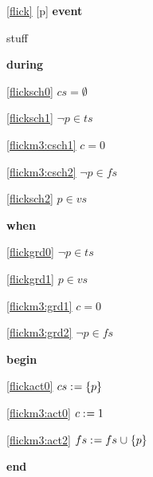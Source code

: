 \noindent \ref{flick} [p] \textbf{event}
  \item   \begin{block}
    \item   stuff
  \end{block}
\begin{block}
  \item   \textbf{during}
  \begin{block}
  \item[ \eqref{flicksch0} ]\sout{$cs = \emptyset$} %
  \item[ \eqref{flicksch1} ]\sout{$\neg p \in ts $} %
  \end{block}
  \begin{block}
  \item[ \eqref{flickm3:csch1} ]{$c = 0 $} %
  \item[ \eqref{flickm3:csch2} ]{$\neg p \in fs $} %
  \item[ \eqref{flicksch2} ]{$p \in vs$} %
  \end{block}
  \item   \textbf{when}
  \begin{block}
  \item[ \eqref{flickgrd0} ]\sout{$\neg p \in ts $} %
  \end{block}
  \begin{block}
  \item[ \eqref{flickgrd1} ]{$p \in vs$} %
  \item[ \eqref{flickm3:grd1} ]{$c = 0 $} %
  \item[ \eqref{flickm3:grd2} ]{$\neg p \in fs $} %
  \end{block}
  \item   \textbf{begin}
  \begin{block}
  \item[ \eqref{flickact0} ]\sout{$cs \mathrel{:\mkern1mu=} \{ p \} $} %
  \end{block}
  \begin{block}
  \item[ \eqref{flickm3:act0} ]{$c \mathrel{:\mkern1mu=} 1$} %
  \item[ \eqref{flickm3:act2} ]{$fs \mathrel{:\mkern1mu=} fs \mathbin{\mkern1mu\cup\mkern1mu} \{ p \} $} %
  \end{block}
  \item   \textbf{end} \\
\end{block}
